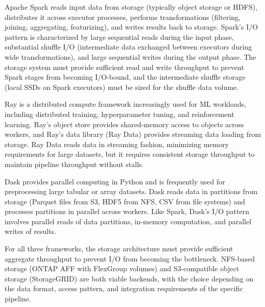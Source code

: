 Apache Spark reads input data from storage (typically object storage or HDFS), distributes it across executor processes, performs transformations (filtering, joining, aggregating, featurizing), and writes results back to storage. Spark's I/O pattern is characterized by large sequential reads during the input phase, substantial shuffle I/O (intermediate data exchanged between executors during wide transformations), and large sequential writes during the output phase. The storage system must provide sufficient read and write throughput to prevent Spark stages from becoming I/O-bound, and the intermediate shuffle storage (local SSDs on Spark executors) must be sized for the shuffle data volume.

Ray is a distributed compute framework increasingly used for ML workloads, including distributed training, hyperparameter tuning, and reinforcement learning. Ray's object store provides shared-memory access to objects across workers, and Ray's data library (Ray Data) provides streaming data loading from storage. Ray Data reads data in streaming fashion, minimizing memory requirements for large datasets, but it requires consistent storage throughput to maintain pipeline throughput without stalls.

Dask provides parallel computing in Python and is frequently used for preprocessing large tabular or array datasets. Dask reads data in partitions from storage (Parquet files from S3, HDF5 from NFS, CSV from file systems) and processes partitions in parallel across workers. Like Spark, Dask's I/O pattern involves parallel reads of data partitions, in-memory computation, and parallel writes of results.

For all three frameworks, the storage architecture must provide sufficient aggregate throughput to prevent I/O from becoming the bottleneck. NFS-based storage (ONTAP AFF with FlexGroup volumes) and S3-compatible object storage (StorageGRID) are both viable backends, with the choice depending on the data format, access pattern, and integration requirements of the specific pipeline.

